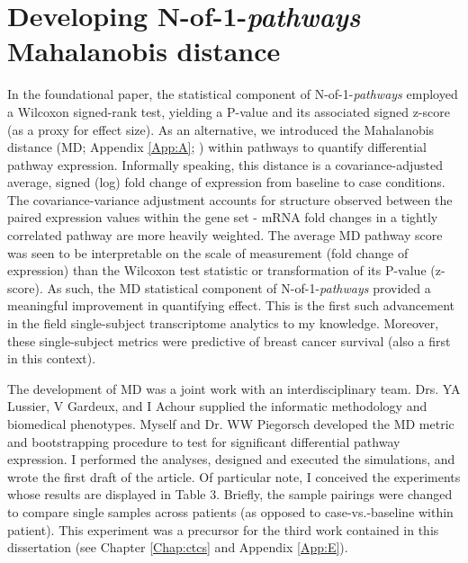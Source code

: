 \chapter{Developing N-of-1-\emph{pathways} \\Mahalanobis distance} \label{Chap:md}

\indent \indent In the foundational paper, the statistical component of N-of-1-\emph{pathways} employed a Wilcoxon signed-rank test, yielding a P-value and its associated signed z-score (as a proxy for effect size). As an alternative, we introduced the Mahalanobis distance (MD; Appendix \ref{App:A}; \cite{Schissler2015}) within pathways to quantify differential pathway expression. Informally speaking, this distance is a covariance-adjusted average, signed (log) fold change of expression from baseline to case conditions. The covariance-variance adjustment accounts for structure observed between the paired expression values within the gene set - mRNA fold changes in a tightly correlated pathway are more heavily weighted. The average MD pathway score was seen to be interpretable on the scale of measurement (fold change of expression) than the Wilcoxon test statistic or transformation of its P-value (z-score). As such, the MD statistical component of N-of-1-\emph{pathways} provided a meaningful improvement in quantifying effect. This is the first such advancement in the field single-subject transcriptome analytics to my knowledge. Moreover, these single-subject metrics were predictive of breast cancer survival (also a first in this context).

The development of MD was a joint work with an interdisciplinary team. Drs. YA Lussier, V Gardeux, and I Achour supplied the informatic methodology and biomedical phenotypes. Myself and Dr. WW Piegorsch developed the MD metric and bootstrapping procedure to test for significant differential pathway expression. I performed the analyses, designed and executed the simulations, and wrote the first draft of the article. Of particular note, I conceived the experiments whose results are displayed in Table 3. Briefly, the sample pairings were changed to compare single samples across patients (as opposed to case-vs.-baseline within patient). This experiment was a precursor for the third work contained in this dissertation (see Chapter \ref{Chap:ctcs} and Appendix \ref{App:E}).
